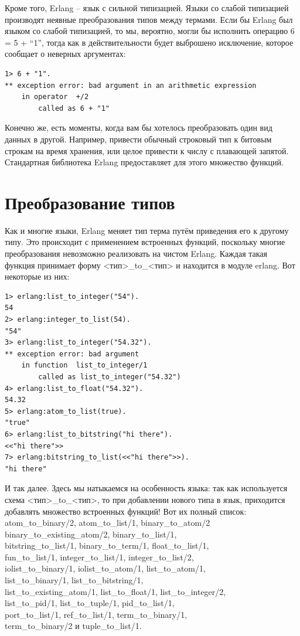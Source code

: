 \documentclass[a4paper,12pt]{report}
\newcommand{\ops}{\colorbox{lgreen}}
\begin{document}
Кроме того, Erlang \--- язык с сильной типизацией. Языки со слабой типизацией производят неявные преобразования типов между термами. Если бы Erlang был языком со слабой типизацией, то мы, вероятно, могли бы исполнить операцию \ops{6 = 5 + ``1''}, тогда как в действительности будет выброшено исключение, которое сообщает о неверных аргументах:
\begin{lstlisting}[style=erlang]
1> 6 + "1".
** exception error: bad argument in an arithmetic expression
    in operator  +/2
        called as 6 + "1"
\end{lstlisting}

Конечно же, есть моменты, когда вам бы хотелось преобразовать один вид данных в другой. Например, привести обычный строковый тип к битовым строкам на время хранения, или целое привести к числу с плавающей запятой. Стандартная библиотека Erlang предоставляет для этого множество функций.
\section{Преобразование типов}
Как и многие языки, Erlang меняет тип терма путём приведения его к другому типу. Это происходит с применением встроенных функций, поскольку многие преобразования невозможно реализовать на чистом Erlang. Каждая такая функция принимает форму <тип>\_to\_<тип> и находится в модуле \ops{erlang}. Вот некоторые из них:
\begin{lstlisting}[style=erlang]
1> erlang:list_to_integer("54").
54
2> erlang:integer_to_list(54).
"54"
3> erlang:list_to_integer("54.32").
** exception error: bad argument
    in function  list_to_integer/1
        called as list_to_integer("54.32")
4> erlang:list_to_float("54.32").
54.32
5> erlang:atom_to_list(true).
"true"
6> erlang:list_to_bitstring("hi there").
<<"hi there">>
7> erlang:bitstring_to_list(<<"hi there">>).
"hi there"
\end{lstlisting}

И так далее. Здесь мы натыкаемся на особенность языка: так как используется схема <тип>\_to\_<тип>, то при добавлении нового типа в язык, приходится добавлять множество встроенных функций! Вот их полный список:
\ops{atom\_to\_binary/2, atom\_to\_list/1, binary\_to\_atom/2}\\
\ops{binary\_to\_existing\_atom/2, binary\_to\_list/1,}\\
\ops{bitstring\_to\_list/1, binary\_to\_term/1, float\_to\_list/1,}\\
\ops{fun\_to\_list/1, integer\_to\_list/1, integer\_to\_list/2,}\\
\ops{iolist\_to\_binary/1, iolist\_to\_atom/1, list\_to\_atom/1,}\\
\ops{list\_to\_binary/1, list\_to\_bitstring/1,}\\
\ops{list\_to\_existing\_atom/1, list\_to\_float/1, list\_to\_integer/2,}\\
\ops{list\_to\_pid/1, list\_to\_tuple/1, pid\_to\_list/1,}\\
\ops{port\_to\_list/1, ref\_to\_list/1, term\_to\_binary/1,}\\
\ops{term\_to\_binary/2 и tuple\_to\_list/1.}
\end{document}
